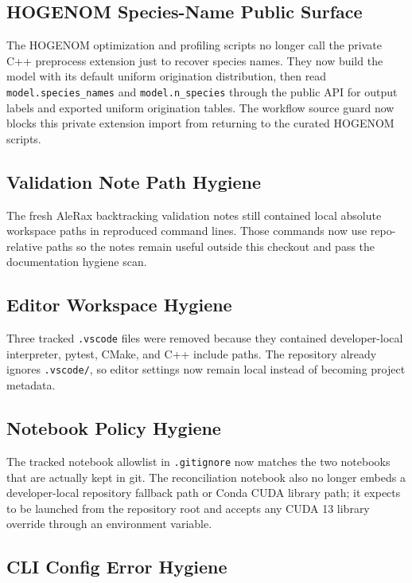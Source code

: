 \documentclass[11pt]{article}
\begin{document}
\subsection{HOGENOM Species-Name Public Surface}

The HOGENOM optimization and profiling scripts no longer call the private C++
preprocess extension just to recover species names.  They now build the model
with its default uniform origination distribution, then read
\texttt{model.species\_names} and \texttt{model.n\_species} through the public
API for output labels and exported uniform origination tables.  The workflow
source guard now blocks this private extension import from returning to the
curated HOGENOM scripts.

\subsection{Validation Note Path Hygiene}

The fresh AleRax backtracking validation notes still contained local absolute
workspace paths in reproduced command lines.  Those commands now use
repo-relative paths so the notes remain useful outside this checkout and pass
the documentation hygiene scan.

\subsection{Editor Workspace Hygiene}

Three tracked \texttt{.vscode} files were removed because they contained
developer-local interpreter, pytest, CMake, and C++ include paths.  The
repository already ignores \texttt{.vscode/}, so editor settings now remain
local instead of becoming project metadata.

\subsection{Notebook Policy Hygiene}

The tracked notebook allowlist in \texttt{.gitignore} now matches the two
notebooks that are actually kept in git.  The reconciliation notebook also no
longer embeds a developer-local repository fallback path or Conda CUDA library
path; it expects to be launched from the repository root and accepts any CUDA
13 library override through an environment variable.

\subsection{CLI Config Error Hygiene}
\end{document}
